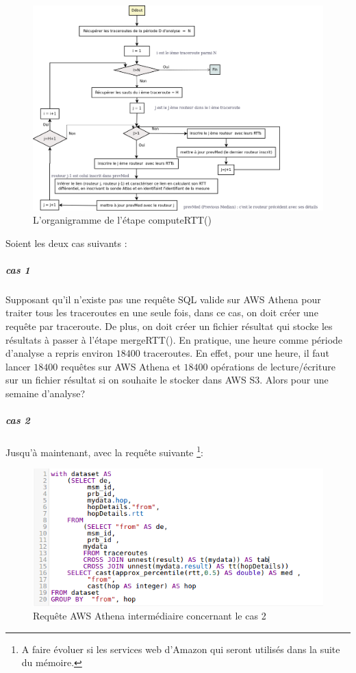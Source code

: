 \begin{figure}[H]
\centering
\includegraphics[width=1\linewidth]{illustrations/organigram-rttAnalysis}
\caption{ L'organigramme de  l'étape computeRTT()}
\label{fig:organigram-rttAnalysis}
\end{figure}

Soient les deux cas suivants :
\subparagraph{cas 1}

Supposant qu'il n'existe pas une requête SQL valide sur AWS Athena pour traiter tous les traceroutes en une seule fois, dans  ce cas, on doit créer une requête par traceroute. De plus, on doit créer un fichier résultat qui stocke les résultats à passer à l'étape mergeRTT(). En pratique, une heure comme période d'analyse a repris environ $ 18400 $ traceroutes. En effet, pour une heure, il faut lancer $ 18400 $ requêtes sur AWS Athena et $ 18400 $ opérations de lecture/écriture sur un fichier résultat si on souhaite le stocker dans AWS S3. Alors pour une semaine d'analyse? 


\subparagraph{cas 2}

Jusqu'à maintenant, avec la requête suivante \footnote{A faire évoluer si les services web d'Amazon qui seront utilisés dans la suite du mémoire.}:


\begin{figure}[H]
\centering
\includegraphics[width=1\linewidth]{illustrations/request}
\caption{Requête AWS Athena intermédiaire concernant le cas 2 }
\label{fig:request}
\end{figure}

